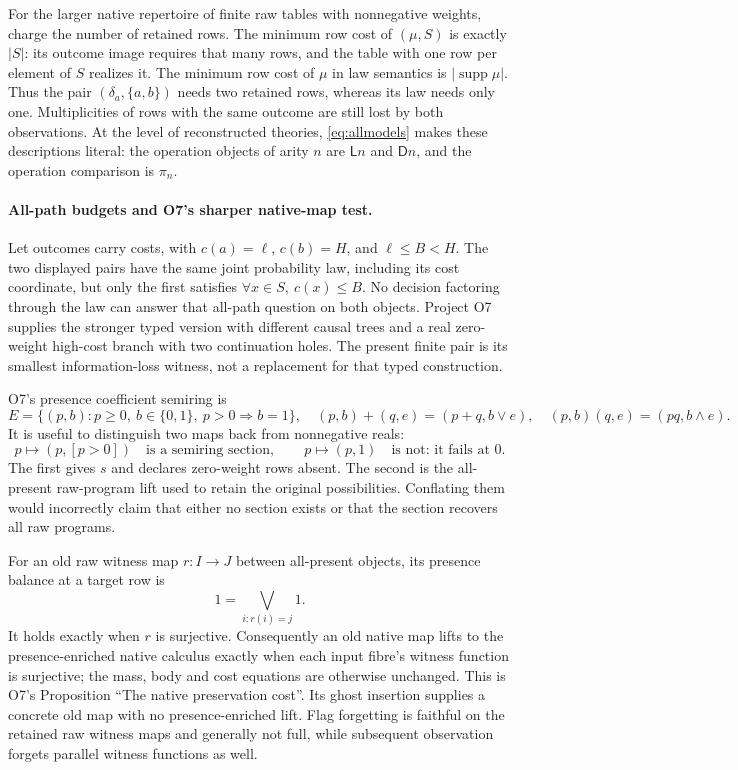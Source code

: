 \documentclass[11pt]{article}
\theoremstyle{definition}
\theoremstyle{remark}
\begin{document}
For the larger native repertoire of finite raw tables with nonnegative
weights, charge the number of retained rows. The minimum row cost of
$(\mu,S)$ is exactly $|S|$: its outcome image requires that many rows,
and the table with one row per element of $S$ realizes it. The minimum
row cost of $\mu$ in law semantics is $|\operatorname{supp}\mu|$.
Thus the pair $(\delta_a,\{a,b\})$ needs two retained rows, whereas its
law needs only one. Multiplicities of rows with the same outcome are
still lost by both observations. At the level of reconstructed theories,
\eqref{eq:allmodels} makes these descriptions literal: the operation
objects of arity $n$ are $\mathsf L n$ and $\mathsf D n$, and the
operation comparison is $\pi_n$.

\paragraph{All-path budgets and O7's sharper native-map test.}
Let outcomes carry costs, with $c(a)=\ell$, $c(b)=H$, and
$\ell\leq B<H$. The two displayed pairs have the same joint probability
law, including its cost coordinate, but only the first satisfies
$\forall x\in S,\ c(x)\leq B$. No decision factoring through the law can
answer that all-path question on both objects. Project O7 supplies the
stronger typed version with different causal trees and a real
zero-weight high-cost branch with two continuation holes. The present
finite pair is its smallest information-loss witness, not a replacement
for that typed construction.

O7's presence coefficient semiring is
\[
 E=\{(p,b):p\geq0,\ b\in\{0,1\},\ p>0\Rightarrow b=1\},
 \quad (p,b)+(q,e)=(p+q,b\lor e),
 \quad (p,b)(q,e)=(pq,b\land e).
\]
It is useful to distinguish two maps back from nonnegative reals:
\[
 p\longmapsto(p,[p>0])\quad\text{is a semiring section},
 \qquad p\longmapsto(p,1)\quad\text{is not: it fails at }0.
\]
The first gives $s$ and declares zero-weight rows absent. The second is
the all-present raw-program lift used to retain the original possibilities.
Conflating them would incorrectly claim that either no section exists or
that the section recovers all raw programs.

For an old raw witness map $r:I\to J$ between all-present objects, its
presence balance at a target row is
\[
 1=\bigvee_{i:r(i)=j}1.
\]
It holds exactly when $r$ is surjective. Consequently an old native map
lifts to the presence-enriched native calculus exactly when each input
fibre's witness function is surjective; the mass, body and cost equations
are otherwise unchanged. This is O7's Proposition ``The native
preservation cost''. Its ghost insertion supplies a concrete old map
with no presence-enriched lift. Flag forgetting is faithful on the
retained raw witness maps and generally not full, while subsequent
observation forgets parallel witness functions as well.
\end{document}
